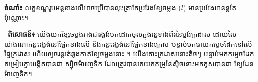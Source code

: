 \begin{center}
	\textbf{ចំណាំ៖  }
	លក្ខខណ្ឌរូបមន្តខាងលើអាចប្រើបានលុះត្រាតែប្រវែងខ្សែចម្លង ($l$)
	មានប្រវែងអានន្តតែប៉ុណ្ណោះ។
\end{center}


\noindent
\begin{minipage}[t]{0.55\textwidth}
	\raggedright
	\faChevronRight\ \textcolor{brownheader}{\textbf{ពិសោធន៍៖ }}
	យើងយកខ្សែចម្លងរាងជារង្វង់មកដោតចូលក្នុងរន្ធទាំងពីរនៃប្លង់ក្រដាស ដោយលៃយ៉ាងណាកន្លះរង្វង់នៅផ្នែកខាងលើ
	និងកន្លះរង្វង់នៅផ្នែកខាងក្រោម
	បន្ទាប់មករោយកម្ទេចដែកនៅលើផ្ទៃក្រដាស
	ហើយឲ្យចរន្តរត់ឆ្លងកាត់ខ្សែចម្លងនោះ ។
	យើងគោះក្រដាសនោះតិចៗ
	បន្ទាប់មកកម្ទេចដែកតម្រៀបគ្នាបង្កើតបានជា
	ស្បុិចម៉ាញេទិក
	ដែលត្រូវបានគេយកគម្រូនៃស៊ិចនោះមកគូសបានជា
	ខ្សែដែនម៉ាញេទិក។

\end{minipage}%
\hfill
\begin{minipage}[t]{0.40\textwidth}
	\vspace{0pt}
	\hspace*{0.5em}%
\end{minipage}

